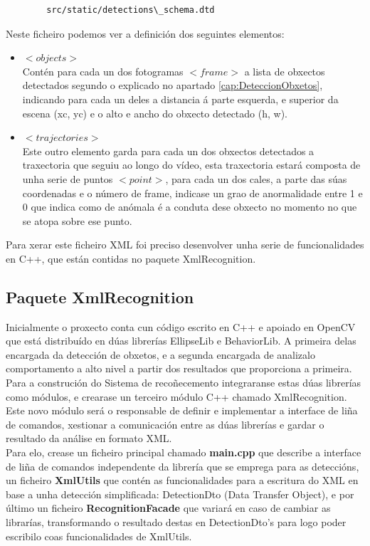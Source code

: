 		\begin{verbatim}
		src/static/detections\_schema.dtd
		\end{verbatim}		 

		Neste ficheiro podemos ver a definición dos seguintes elementos:
		\begin{itemize}
		\item{{\textbf{$<objects>$\\}}}
			Contén para cada un dos fotogramas $<frame>$ a lista de obxectos detectados segundo
			o explicado no apartado \ref{cap:DeteccionObxetos}, indicando para cada un deles a
			distancia á parte esquerda, e superior da escena (xc, yc) e o alto e ancho do obxecto
			detectado (h, w).
		\item{{\textbf{$<trajectories>$\\}}}
			Este outro elemento garda para cada un dos obxectos detectados a traxectoria que 
			seguiu ao longo do vídeo, esta traxectoria estará composta de unha serie de puntos
			$<point>$, para cada un dos cales, a parte das súas coordenadas e o número de 
			frame, indicase un grao de anormalidade entre 1 e 0 que indica como de anómala é 
			a conduta dese obxecto no momento no que se atopa sobre ese punto.
		\end{itemize}
		
		Para xerar este ficheiro XML foi preciso desenvolver unha serie de funcionalidades en C++,
		que están contidas no paquete XmlRecognition.
	
	\subsection{Paquete XmlRecognition}
		Inicialmente o proxecto conta cun código escrito en C++ e apoiado en OpenCV que está distribuído en
		dúas librerías EllipseLib e BehaviorLib. A primeira delas encargada da detección de obxetos, e a segunda
		encargada de analizalo comportamento a alto nivel a partir dos resultados que proporciona a primeira.\\
		
		Para a construción do Sistema de recoñecemento integraranse estas dúas librerías como módulos, e 
		crearase un terceiro módulo C++ chamado XmlRecognition. Este novo módulo será o responsable de definir e
		implementar a interface de liña de comandos, xestionar a comunicación entre as dúas librerías e gardar
		o resultado da análise en formato XML.\\
		
		Para elo, crease un ficheiro principal chamado \textbf{main.cpp} que describe a interface de liña de comandos
		independente da librería que se emprega para as deteccións, un ficheiro \textbf{XmlUtils} que contén as
		funcionalidades para a escritura do XML en base a unha detección simplificada: DetectionDto 
		(Data Transfer Object), e por último un ficheiro \textbf{RecognitionFacade} que variará en 
		caso de cambiar as librarías, transformando o resultado destas en DetectionDto's para logo
		poder escribilo coas funcionalidades de XmlUtils.
		
